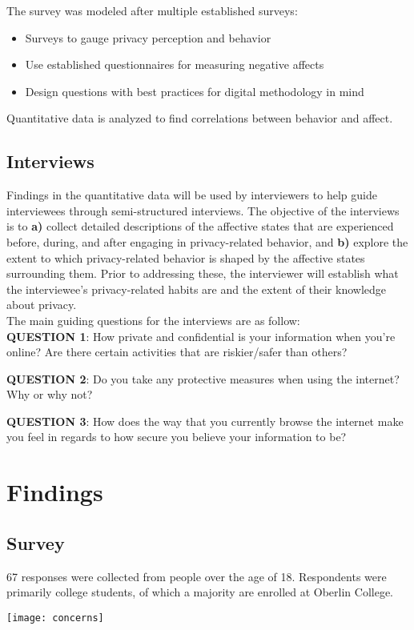 \documentclass[acmtog]{acmart}
\begin{document}
\noindent The survey was modeled after multiple established surveys:
\begin{itemize}
    \item Surveys to gauge privacy perception and behavior
    \item Use established questionnaires for measuring negative affects \cite{Rusch2007}
    \item Design questions with best practices for digital methodology in mind \cite{Hampton2017}
\end{itemize}

Quantitative data is analyzed to find correlations between behavior and affect.
\subsection{Interviews}
Findings in the quantitative data will be used by interviewers to help guide interviewees through semi-structured interviews. The objective of the interviews is to \textbf{a)} collect detailed descriptions of the affective states that are experienced before, during, and after engaging in privacy-related behavior, and \textbf{b)} explore the extent to which privacy-related behavior is shaped by the affective states surrounding them. Prior to addressing these, the interviewer will establish what the interviewee's privacy-related habits are and the extent of their knowledge about privacy. \\

The main guiding questions for the interviews are as follow:\\

\textbf{QUESTION 1}: How private and confidential is your information when you’re online? Are there certain activities that are riskier/safer than others?

\textbf{QUESTION 2}: Do you take any protective measures when using the internet? Why or why not?

\textbf{QUESTION 3}: How does the way that you currently browse the internet make you feel in regards to how secure you believe your information to be?

\section{Findings}
\subsection{Survey}
67 responses were collected from people over the age of 18. Respondents were primarily  college students, of which a majority are enrolled at Oberlin College.

\texttt{[image: concerns]}






\appendix
\end{document}
